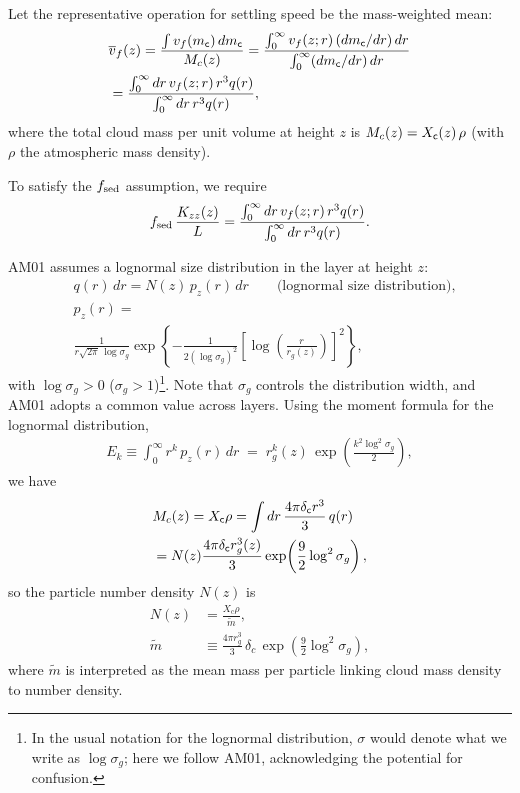 Let the representative operation for settling speed be the mass-weighted mean:
\begin{align}
\label{eq:fsedw}
&\overline{v}_f(z) 
= \frac{\int v_f(m_{\mathsf{c}})\, dm_{\mathsf{c}}}{M_c(z)}
= \frac{\int_0^\infty v_f(z; r)\, (dm_{\mathsf{c}}/dr)\, dr}{ \int_0^\infty (dm_{\mathsf{c}}/dr)\, dr } \nonumber \\
&= \frac{\int_0^\infty dr \, v_f(z;r)\, r^3 q(r)}{ \int_0^\infty dr \, r^3 q(r)},
\end{align}
where the total cloud mass per unit volume at height $z$ is $M_c(z)=X_{\mathsf{c}}(z)\,\rho$ (with $\rho$ the atmospheric mass density).

To satisfy the $f_\mathrm{sed}$ assumption, we require
\begin{align}
\label{eq:fsedw2}
f_\mathrm{sed}\, \frac{K_{zz}(z)}{L} 
= \frac{\int_0^\infty dr \, v_f(z;r)\, r^3 q(r)}{ \int_0^\infty dr \, r^3 q(r)}.
\end{align}

AM01 assumes a lognormal size distribution in the layer at height $z$:
\begin{align}
\label{eq:lognormal_am01}
&q(r)\, dr = N(z)\, p_z(r)\, dr \qquad\text{(lognormal size distribution)}, \\
&p_z(r) = \nonumber \\
&\frac{1}{r \sqrt{2 \pi}\, \log{\sigma_g}} 
\exp\!\left\{ - \frac{1}{2 (\log{\sigma_g})^2} \left[\log\!\left(\frac{r}{r_g(z)}\right)\right]^{\!2} \right\},
\end{align}
with $\log{\sigma_g}>0$ ($\sigma_g>1$)\footnote{In the usual notation for the lognormal distribution, $\sigma$ would denote what we write as $\log{\sigma_g}$; here we follow AM01, acknowledging the potential for confusion.}.  
Note that $\sigma_g$ controls the distribution width, and AM01 adopts a common value across layers.  
Using the moment formula for the lognormal distribution,
\begin{align}
E_k \equiv \int_0^\infty r^k\, p_z(r)\, dr \;=\; r_g^k(z)\, \exp\!\left(\frac{k^2 \log^2{\sigma_g}}{2}\right),
\end{align}
we have
\begin{align}
&M_c(z) = X_{\mathsf{c}} \rho 
= \int dr \, \frac{4 \pi \delta_{\mathsf{c}} r^3}{3}\, q(r) \nonumber \\
&= N(z) \frac{4 \pi \delta_{\mathsf{c}} r_g^3(z)}{3} \exp\!\left(\frac{9}{2}\log^2 \sigma_g\right),
\end{align}
so the particle number density $N(z)$ is
\begin{align}
\label{eq:lognormal_am01N}
N(z) &= \frac{X_\mathrm{c} \rho}{\tilde{m}}, \\ 
\label{eq:lognormal_mean_mass}
\tilde{m} &\equiv \frac{4 \pi r_g^3}{3}\, \delta_c \, \exp\!\left(\frac{9}{2} \log^2{\sigma_g} \right),
\end{align}
where $\tilde{m}$ is interpreted as the mean mass per particle linking cloud mass density to number density.

